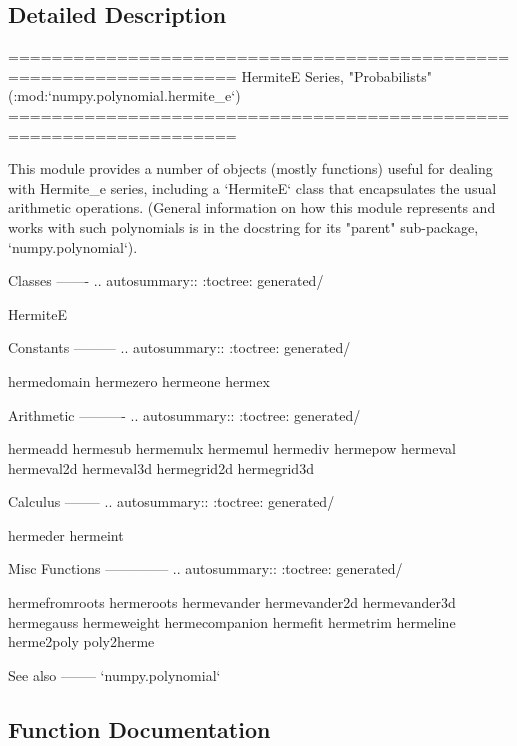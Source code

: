 \subsection{Detailed Description}
\begin{DoxyVerb}===================================================================
HermiteE Series, "Probabilists" (:mod:`numpy.polynomial.hermite_e`)
===================================================================

This module provides a number of objects (mostly functions) useful for
dealing with Hermite_e series, including a `HermiteE` class that
encapsulates the usual arithmetic operations.  (General information
on how this module represents and works with such polynomials is in the
docstring for its "parent" sub-package, `numpy.polynomial`).

Classes
-------
.. autosummary::
   :toctree: generated/

   HermiteE

Constants
---------
.. autosummary::
   :toctree: generated/

   hermedomain
   hermezero
   hermeone
   hermex

Arithmetic
----------
.. autosummary::
   :toctree: generated/

   hermeadd
   hermesub
   hermemulx
   hermemul
   hermediv
   hermepow
   hermeval
   hermeval2d
   hermeval3d
   hermegrid2d
   hermegrid3d

Calculus
--------
.. autosummary::
   :toctree: generated/

   hermeder
   hermeint

Misc Functions
--------------
.. autosummary::
   :toctree: generated/

   hermefromroots
   hermeroots
   hermevander
   hermevander2d
   hermevander3d
   hermegauss
   hermeweight
   hermecompanion
   hermefit
   hermetrim
   hermeline
   herme2poly
   poly2herme

See also
--------
`numpy.polynomial`\end{DoxyVerb}
 

\subsection{Function Documentation}
\mbox{\label{namespacenumpy_1_1polynomial_1_1hermite__e_a30a68223aae03cc27f8cb5849e9e9a40}} 

